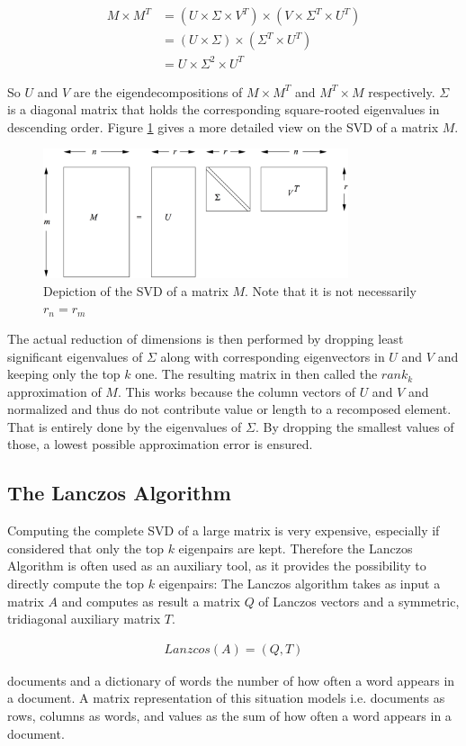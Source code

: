 \begin{align*}
M \times M^T 	& = (U \times \Sigma \times V^T) \times (V \times \Sigma^T \times
U^T) \\
					& = (U \times \Sigma) \times (\Sigma^T \times U^T) \\
					& = U \times \Sigma^2 \times U^T
\end{align*}

So $U$ and $V$ are the eigendecompositions of $M\times M^T$ and $M^T\times M$
respectively. $\Sigma$ is a diagonal matrix that holds the corresponding
square-rooted eigenvalues in descending order. Figure \ref{fig:svd} gives a
more detailed view on the SVD of a matrix $M$.

\begin{figure}[h]
	\centering
	\includegraphics[width=0.8\textwidth]{images/svd_mmds.png}
\caption{Depiction of the SVD of a matrix $M$. Note that it is not necessarily
$r_n = r_m$}
	\label{fig:svd}
\end{figure}

The actual reduction of dimensions is then performed by dropping least
significant eigenvalues of $\Sigma$ along with corresponding eigenvectors in
$U$ and $V$ and keeping only the top $k$ one. The resulting matrix in then
called the $rank_k$ approximation of $M$. This works because the column vectors
of $U$ and $V$ and normalized and thus do not contribute value or length to a
recomposed element. That is entirely done by the eigenvalues of $\Sigma$. By
dropping the smallest values of those, a lowest possible approximation error is
ensured.

\subsection{The Lanczos Algorithm}
\label{ssec:lanczos_algorithm}

Computing the complete SVD of a large matrix is very expensive, especially if
considered that only the top $k$ eigenpairs are kept. Therefore the Lanczos
Algorithm is often used as an auxiliary tool, as it provides the possibility to
directly compute the top $k$ eigenpairs: The Lanczos algorithm takes as input a
matrix $A$ and computes as result a matrix $Q$ of Lanczos vectors and a
symmetric, tridiagonal auxiliary matrix $T$.

\begin{align*}
	Lanzcos(A) = (Q,T)
\end{align*}


documents and a dictionary of words the number of how often a word appears in a
document. A matrix representation of this situation models i.e. documents as
rows, columns as words, and values as the sum of how often a word appears in a
document.


